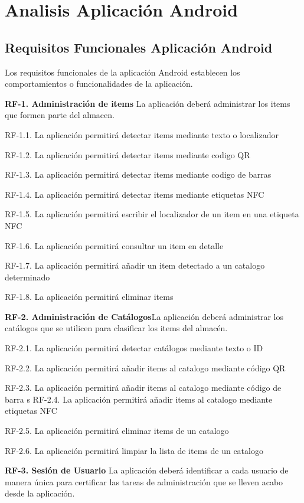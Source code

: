 \documentclass[a4paper,11pt]{book}
\begin{document}
\section{Analisis Aplicación Android}
\subsection{Requisitos Funcionales Aplicación Android}
Los requisitos funcionales de la aplicación Android establecen los comportamientos o funcionalidades de la aplicación.

\textbf{RF-1. Administración de items} La aplicación deberá administrar los items que formen parte del almacen.   


	RF-1.1. La aplicación permitirá detectar items mediante texto o localizador
	
	RF-1.2. La aplicación permitirá detectar items mediante codigo QR
	
	RF-1.3. La aplicación permitirá detectar items mediante codigo de barras
	
	RF-1.4. La aplicación permitirá detectar items mediante etiquetas NFC
	
	RF-1.5. La aplicación permitirá escribir el localizador de un item en una etiqueta NFC
	
	RF-1.6. La aplicación permitirá consultar un item en detalle
	
	RF-1.7. La aplicación permitirá añadir un item detectado a un catalogo determinado
	
	RF-1.8. La aplicación permitirá eliminar items


\textbf{RF-2. Administración de Catálogos}La aplicación deberá administrar los catálogos que se utilicen para clasificar los items del almacén.   


	RF-2.1. La aplicación permitirá detectar catálogos mediante texto o ID
	
	RF-2.2. La aplicación permitirá añadir items  al catalogo mediante código QR
	
	RF-2.3. La aplicación permitirá añadir items al catalogo mediante código de barra
	s
	RF-2.4. La aplicación permitirá añadir items al catalogo mediante etiquetas NFC
	
	RF-2.5. La aplicación permitirá eliminar items de un catalogo
	
	RF-2.6. La aplicación permitirá limpiar la lista de items de un catalogo
	
	
\textbf{RF-3. Sesión de Usuario} La aplicación deberá identificar a cada usuario de manera única para certificar las tareas de administración que se lleven acabo desde la aplicación. 
\end{document}
